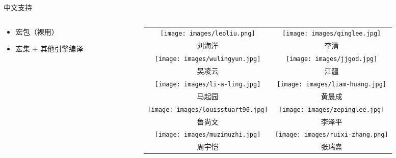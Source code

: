 \begin{frame}{中文支持}
\begin{columns}
\begin{column}{0.66\textwidth}
\begin{itemize}
      \begin{itemize}
        \item {} 宏包（裸用）
        \item {} 宏集 + 其他引擎编译
      \end{itemize}
  \end{itemize}
\end{column} \pause
\begin{column}{0.32\textwidth}
  \tiny
  \begin{tabular}{cc}
    \texttt{[image: images/leoliu.png]}        &
    \texttt{[image: images/qinglee.jpg]}       \\
    刘海洋 & 李清 \\[2ex]
    \texttt{[image: images/wulingyun.jpg]}     &
    \texttt{[image: images/jjgod.jpg]}         \\
    吴凌云 & 江疆 \\[2ex]
    \texttt{[image: images/li-a-ling.jpg]}     &
    \texttt{[image: images/liam-huang.jpg]}    \\
    马起园 & 黄晨成 \\[2ex]
    \texttt{[image: images/louisstuart96.jpg]} &
    \texttt{[image: images/zepinglee.jpg]}     \\
    鲁尚文 & 李泽平 \\[2ex]
    \texttt{[image: images/muzimuzhi.jpg]}     &
    \texttt{[image: images/ruixi-zhang.png]}   \\
    周宇恺 & 张瑞熹
  \end{tabular}
  \vspace{-0.6cm}
\end{column}
\end{columns}
\end{frame}

